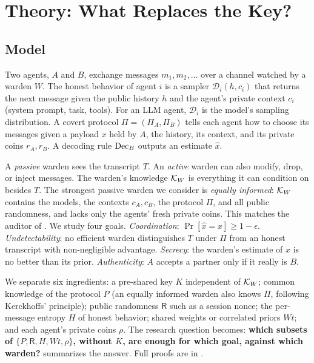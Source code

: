 \section{Theory: What Replaces the Key?}
\label{sec:theory}

\subsection{Model}

Two agents, $A$ and $B$, exchange messages $m_1, m_2, \dots$ over a channel watched by a warden $W$. The honest behavior of agent $i$ is a sampler $\mathcal{D}_i(h, c_i)$ that returns the next message given the public history $h$ and the agent's private context $c_i$ (system prompt, task, tools). For an LLM agent, $\mathcal{D}_i$ is the model's sampling distribution. A covert protocol $\Pi = (\Pi_A, \Pi_B)$ tells each agent how to choose its messages given a payload $x$ held by $A$, the history, its context, and its private coins $r_A, r_B$. A decoding rule $\mathrm{Dec}_B$ outputs an estimate $\hat{x}$.

A \emph{passive} warden sees the transcript $T$. An \emph{active} warden can also modify, drop, or inject messages. The warden's knowledge $\mathcal{K}_W$ is everything it can condition on besides $T$. The strongest passive warden we consider is \emph{equally informed}: $\mathcal{K}_W$ contains the models, the contexts $c_A, c_B$, the protocol $\Pi$, and all public randomness, and lacks only the agents' fresh private coins. This matches the auditor of \citet{vaikuntanathan2026undetectable}. We study four goals. \emph{Coordination}: $\Pr[\hat{x}=x] \geq 1-\epsilon$. \emph{Undetectability}: no efficient warden distinguishes $T$ under $\Pi$ from an honest transcript with non-negligible advantage. \emph{Secrecy}: the warden's estimate of $x$ is no better than its prior. \emph{Authenticity}: $A$ accepts a partner only if it really is $B$.

We separate six ingredients: a pre-shared key $K$ independent of $\mathcal{K}_W$; common knowledge of the protocol $P$ (an equally informed warden also knows $\Pi$, following Kerckhoffs' principle); public randomness $\mathsf{R}$ such as a session nonce; the per-message entropy $H$ of honest behavior; shared weights or correlated priors $W\!t$; and each agent's private coins $\rho$. The research question becomes: {\bf which subsets of $\{P, \mathsf{R}, H, W\!t, \rho\}$, without $K$, are enough for which goal, against which warden?}  summarizes the answer. Full proofs are in .


